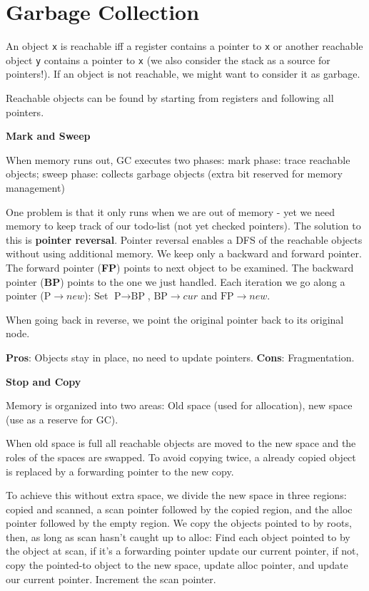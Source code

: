 \section*{Garbage Collection}

An object \texttt{x} is reachable iff a register contains a pointer to \texttt{x} or another reachable object \texttt{y} contains a pointer to \texttt{x} (we also consider the stack as a source for pointers!). If an object is not reachable, we might want to consider it as garbage. \medskip

Reachable objects can be found by starting from registers and following all pointers. \medskip

\textbf{Mark and Sweep} \smallskip

When memory runs out, GC executes two phases: mark phase: trace reachable objects; sweep phase: collects garbage objects (extra bit reserved for memory management)\medskip

One problem is that it only runs when we are out of memory - yet we need memory
to keep track of our todo-list (not yet checked pointers). The solution to this
is \textbf{pointer reversal}. Pointer reversal enables a DFS
of the reachable objects without using additional memory. We keep only a
backward and forward pointer. The forward pointer (\textbf{FP}) points to next object to
be examined. The backward pointer (\textbf{BP}) points to the
one we just handled.
Each iteration we go along a pointer ($\text{P} \to new$): Set $\text{P} \to \text{BP}$,
$\text{BP} \to cur$ and $\text{FP} \to new$.

When going back in reverse, we point the original pointer back to its original node.
\medskip

\textbf{Pros}: Objects stay in place, no need to update pointers. \textbf{Cons}: Fragmentation.\medskip

\textbf{Stop and Copy} \smallskip

Memory is organized into two areas: Old space (used for allocation), new space (use as a reserve for GC). \medskip

When old space is full all reachable objects are moved to the new space and the roles of the spaces are swapped. To avoid copying twice, a already copied object is replaced by a forwarding pointer to the new copy. \medskip

To achieve this without extra space, we divide the new space in three regions: copied and scanned, a scan pointer followed by the copied region, and the alloc pointer followed by the empty region. We copy the objects pointed to by roots, then, as long as scan hasn't caught up to alloc: Find each object pointed to by the object at scan, if it's a forwarding pointer update our current pointer, if not, copy the pointed-to object to the new space, update alloc pointer, and update our current pointer. Increment the scan pointer. \medskip

